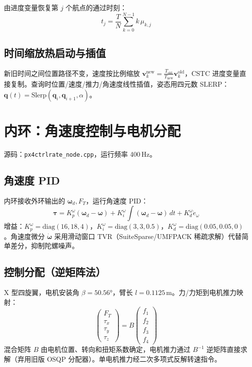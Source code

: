 \documentclass[UTF8, a4paper, 11pt]{ctexart}
\newcommand{\bv}{\mathbf{v}}
\newcommand{\bq}{\mathbf{q}}
\newcommand{\bw}{\boldsymbol{\omega}}
\newcommand{\diag}{\mathrm{diag}}
\begin{document}
由进度变量恢复第 $j$ 个航点的通过时刻：
\begin{equation}
  t_j = \frac{T}{N}\sum_{k=0}^{N-1} k\,\mu_{k,j}
  \tag{F13}
\end{equation}

\subsection{时间缩放热启动与插值}

新旧时间之间位置路径不变，速度按比例缩放 $\bv^{\text{new}}_k = \frac{T_{\text{old}}}{T_{\text{new}}}\bv^{\text{old}}_k$，CSTC 进度变量直接复制。查询时位置/速度/推力/角速度线性插值，姿态用四元数 SLERP：$\bq(t)=\text{Slerp}(\bq_i,\bq_{i+1},\alpha)$。

\section{内环：角速度控制与电机分配}

源码：\texttt{px4ctrlrate\_node.cpp}，运行频率 400\,Hz。

\subsection{角速度 PID}

内环接收外环输出的 $\bw_d, F_T$，运行角速度 PID：
\begin{equation}
  \boldsymbol{\tau} = K_p^{\omega}(\bw_d-\bw) + K_i^{\omega}\!\int(\bw_d-\bw)\,dt + K_d^{\omega}\dot{e}_{\omega}
\end{equation}
增益：$K_p^{\omega}=\diag(16,18,4)$，$K_i^{\omega}=\diag(3,3,0.5)$，$K_d^{\omega}=\diag(0.05,0.05,0)$。角速度微分 $\dot{\bw}$ 采用滑动窗口 TVR（SuiteSparse/UMFPACK 稀疏求解）代替简单差分，抑制陀螺噪声。

\subsection{控制分配（逆矩阵法）}

X 型四旋翼，电机安装角 $\beta=50.56°$，臂长 $l=0.1125$\,m。力/力矩到电机推力映射：
\begin{equation}
  \begin{pmatrix}F_T\\\tau_x\\\tau_y\\\tau_z\end{pmatrix} = B\begin{pmatrix}f_1\\f_2\\f_3\\f_4\end{pmatrix}
\end{equation}
混合矩阵 $B$ 由电机位置、转向和扭矩系数确定，电机推力通过 $B^{-1}$ 逆矩阵直接求解（弃用旧版 OSQP 分配器）。单电机推力经二次多项式反解转速指令。
\end{document}
